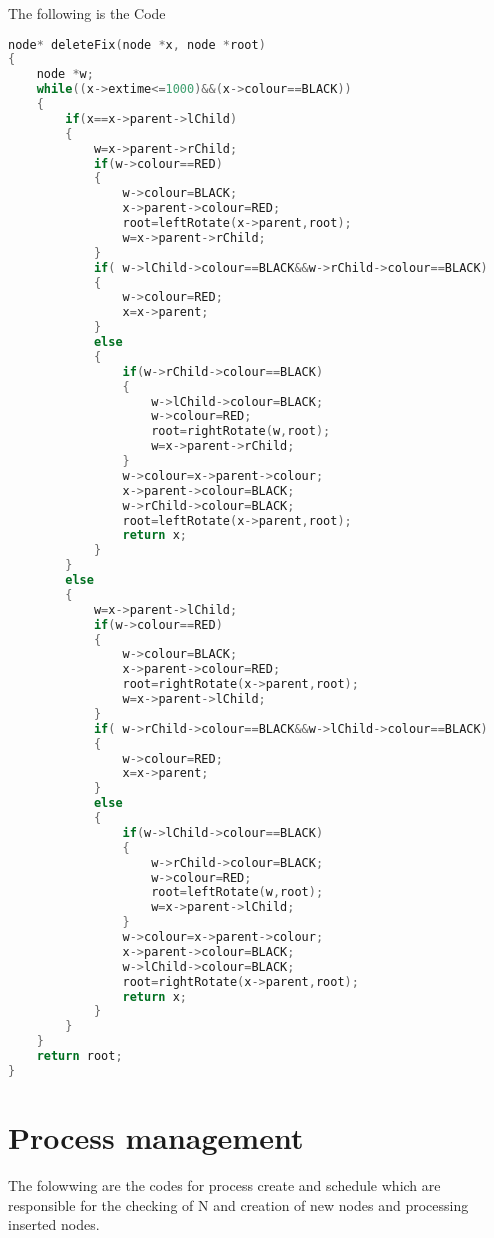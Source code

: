 \documentclass{article}
\begin{document}
The following is the Code
\begin{lstlisting}[language=c, caption=deleteFix]
node* deleteFix(node *x, node *root)
{
    node *w;
    while((x->extime<=1000)&&(x->colour==BLACK))
    {
        if(x==x->parent->lChild)
        {
            w=x->parent->rChild;
            if(w->colour==RED)
            {
                w->colour=BLACK;
                x->parent->colour=RED;
                root=leftRotate(x->parent,root);
                w=x->parent->rChild;
            }
            if( w->lChild->colour==BLACK&&w->rChild->colour==BLACK)
            {
                w->colour=RED;
                x=x->parent;
            }
            else
            {
                if(w->rChild->colour==BLACK)
                {
                    w->lChild->colour=BLACK;
                    w->colour=RED;
                    root=rightRotate(w,root);
                    w=x->parent->rChild;
                }
                w->colour=x->parent->colour;
                x->parent->colour=BLACK;
                w->rChild->colour=BLACK;
                root=leftRotate(x->parent,root);
                return x;
            }
        }
        else
        {
            w=x->parent->lChild;
            if(w->colour==RED)
            {
                w->colour=BLACK;
                x->parent->colour=RED;
                root=rightRotate(x->parent,root);
                w=x->parent->lChild;
            }
            if( w->rChild->colour==BLACK&&w->lChild->colour==BLACK)
            {
                w->colour=RED;
                x=x->parent;
            }
            else
            {
                if(w->lChild->colour==BLACK)
                {
                    w->rChild->colour=BLACK;
                    w->colour=RED;
                    root=leftRotate(w,root);
                    w=x->parent->lChild;
                }
                w->colour=x->parent->colour;
                x->parent->colour=BLACK;
                w->lChild->colour=BLACK;
                root=rightRotate(x->parent,root);
                return x;
            }
        }
    }
    return root;
}
\end{lstlisting}

\section{Process management}

The folowwing are the codes for process create and schedule which are responsible for the checking of N and creation of new nodes and processing inserted nodes.
\end{document}
